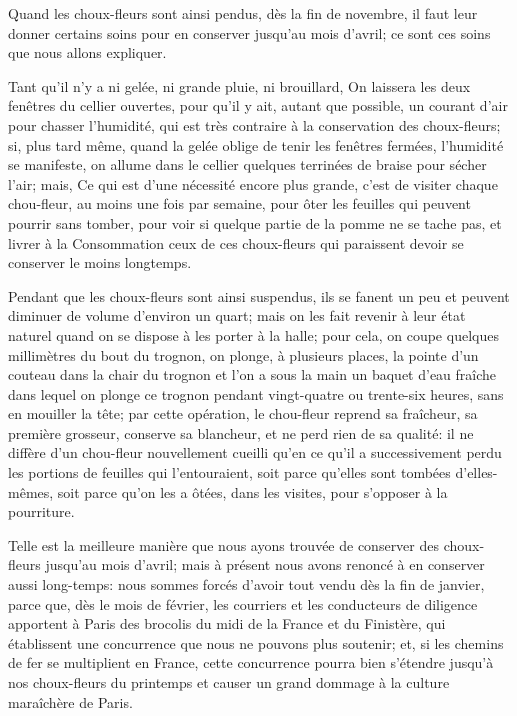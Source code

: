 \documentclass[10pt,a4paper]{book}
\begin{document}
Quand les choux-fleurs sont ainsi pendus, dès la fin de novembre, il faut leur donner certains soins pour en conserver jusqu'au mois d'avril; ce sont ces soins que nous allons expliquer.

Tant qu'il n'y a ni gelée, ni grande pluie, ni brouillard, On laissera les deux fenêtres du cellier ouvertes, pour qu'il y ait, autant que possible, un courant d'air pour chasser l'humidité, qui est très contraire à la conservation des choux-fleurs; si, plus tard même, quand la gelée oblige de tenir les fenêtres fermées, l'humidité se manifeste, on allume dans le cellier quelques terrinées de braise pour sécher l'air; mais, Ce qui est d'une nécessité encore plus grande, c'est de visiter chaque chou-fleur, au moins une fois par semaine, pour ôter les feuilles qui peuvent pourrir sans tomber, pour voir si quelque partie de la pomme ne se tache pas, et livrer à la Consommation ceux de ces choux-fleurs qui paraissent devoir se conserver le moins longtemps.

Pendant que les choux-fleurs sont ainsi suspendus, ils se fanent un peu et peuvent diminuer de volume d'environ un quart; mais on les fait revenir à leur état naturel quand on se dispose à les porter à la halle; pour cela, on coupe quelques millimètres du bout du trognon, on plonge, à plusieurs places, la pointe d'un couteau dans la chair du trognon et l'on a sous la main un baquet d'eau fraîche dans lequel on plonge ce trognon pendant vingt-quatre ou trente-six heures, sans en mouiller la tête; par cette opération, le chou-fleur reprend sa fraîcheur, sa première grosseur, conserve sa blancheur, et ne perd rien de sa qualité: il ne diffère d'un chou-fleur nouvellement cueilli qu'en ce qu'il a successivement perdu les portions de feuilles qui l'entouraient, soit parce qu'elles sont tombées d'elles-mêmes, soit parce qu'on les a ôtées, dans les visites, pour s'opposer à la pourriture.

Telle est la meilleure manière que nous ayons trouvée de conserver des choux-fleurs jusqu'au mois d'avril; mais à présent nous avons renoncé à en conserver aussi long-temps: nous sommes forcés d'avoir tout vendu dès la fin de janvier, parce que, dès le mois de février, les courriers et les conducteurs de diligence apportent à Paris des brocolis du midi de la France et du Finistère, qui établissent une concurrence que nous ne pouvons plus soutenir; et, si les chemins de fer se multiplient en France, cette concurrence pourra bien s'étendre jusqu'à nos choux-fleurs du printemps et causer un grand dommage à la culture maraîchère de Paris.
\end{document}
